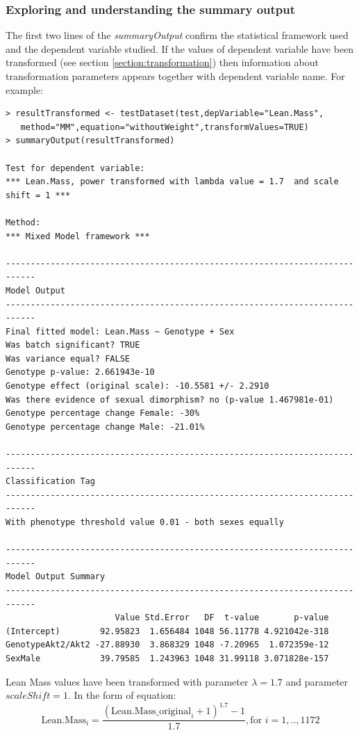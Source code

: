 \documentclass[12pt,a4paper]{article}
\begin{document}
\subsubsection{Exploring and understanding the summary output}
\label{cs1_output}
The first two lines of the \textit{summaryOutput} confirm the statistical framework used and the dependent variable studied. If the values of dependent variable have been transformed (see section \ref{section:transformation}) then information about transformation parameters appears together with dependent variable name. For example:
\begingroup
    \fontsize{8pt}{12pt}\selectfont
\begin{verbatim}
> resultTransformed <- testDataset(test,depVariable="Lean.Mass",
   method="MM",equation="withoutWeight",transformValues=TRUE)
> summaryOutput(resultTransformed)

Test for dependent variable:
*** Lean.Mass, power transformed with lambda value = 1.7  and scale shift = 1 ***

Method:
*** Mixed Model framework ***

----------------------------------------------------------------------------
Model Output
----------------------------------------------------------------------------
Final fitted model: Lean.Mass ~ Genotype + Sex
Was batch significant? TRUE
Was variance equal? FALSE
Genotype p-value: 2.661943e-10
Genotype effect (original scale): -10.5581 +/- 2.2910
Was there evidence of sexual dimorphism? no (p-value 1.467981e-01)
Genotype percentage change Female: -30%
Genotype percentage change Male: -21.01%

----------------------------------------------------------------------------
Classification Tag
----------------------------------------------------------------------------
With phenotype threshold value 0.01 - both sexes equally

----------------------------------------------------------------------------
Model Output Summary
----------------------------------------------------------------------------
                      Value Std.Error   DF  t-value       p-value
(Intercept)        92.95823  1.656484 1048 56.11778 4.921042e-318
GenotypeAkt2/Akt2 -27.88930  3.868329 1048 -7.20965  1.072359e-12
SexMale            39.79585  1.243963 1048 31.99118 3.071828e-157
\end{verbatim}
\endgroup 
 
Lean Mass values have been transformed with parameter $\lambda = 1.7$ and parameter $scaleShift = 1$. In the form of equation:
\[
  \text{Lean.Mass}_i = \frac{(\text{Lean.Mass\_original}_i + 1)^{1.7} - 1}{1.7}, \text{for $i = 1, .., 1172$}
\]
\end{document}
